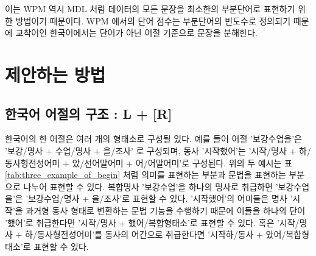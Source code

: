 \documentclass[oneside, ko,phd]{snuthesis_utf8_kor}
\begin{document}
이는 WPM 역시 MDL 처럼 데이터의 모든 문장을 최소한의 부분단어로 표현하기 위한 방법이기 때문이다.
WPM 에서의 단어 점수는 부분단어의 빈도수로 정의되기 때문에 교착어인 한국어에서는 단어가 아닌 어절 기준으로 문장을 분해한다.

\section{제안하는 방법}

\subsection{한국어 어절의 구조 : L + [R]} \label{lrstructure}

한국어의 한 어절은 여러 개의 형태소로 구성될 있다.
예를 들어 어절 '보강수업을'은 '보강/명사 + 수업/명사 + 을/조사' 로 구성되며, 동사 '시작했어'는 '시작/명사 + 하/동사형전성어미 + 았/선어말어미 + 어/어말어미'로 구성된다.
위의 두 예시는 표 \ref{tab:three_example_of_begin} 처럼 의미를 표현하는 부분과 문법을 표현하는 부분으로 나누어 표현할 수 있다.
복합명사 '보강수업'을 하나의 명사로 취급하면 '보강수업을'은 '보강수업/명사 + 을/조사'로 표현할 수 있다.
'시작했어'의 어미들은 명사 '시작'을 과거형 동사 형태로 변환하는 문법 기능을 수행하기 때문에 이들을 하나의 단어 '했어'로 취급한다면 '시작/명사 + 했어/복합형태소'로 표현할 수 있다.
혹은 '시작/명사 + 하/동사형전성어미'를 동사의 어간으로 취급한다면 '시작하/동사 + 았어/복합형태소'로 표현할 수 있다.

\begin{table}[H]
\small
\centering
\caption{명사가 포함된 어절의 구조. (N: 명사, J: 조사, V: 동사, E: 어미, EP: 선어말어미, VCP: 동사형 전성어미)}
\label{tab:three_example_of_begin}
\end{table}
\end{document}
